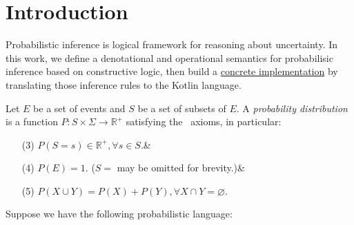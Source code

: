 \documentclass{article}
\begin{document}
\section{Introduction}\label{sec:intro}

Probabilistic inference is logical framework for reasoning about uncertainty. In this work, we define a denotational and operational semantics for probabilisic inference based on constructive logic, then build a \href{https://github.com/breandan/markovian}{concrete implementation} by translating those inference rules to the Kotlin language.

Let $E$ be a set of events and $S$ be a set of subsets of $E$. A \textit{probability distribution} is a function $P: S \times \Sigma \rightarrow \mathbb{R}^{+}$ satisfying the~\citet{kolmogorov1933grundbegriffe} axioms, in particular:

\begin{itemize}
    \itemsep-1em
    \item [(3)] $P(S = s) \in \mathbb{R}^{+}, \forall s \in S$.& \\
    \item [(4)] $P(E) = 1$. ($S = $ may be omitted for brevity.)& \\
    \item [(5)] $P(X \cup Y) = P(X) + P(Y), \forall X \cap Y = \varnothing$.
\end{itemize}



%

Suppose we have the following probabilistic language:
\end{document}

